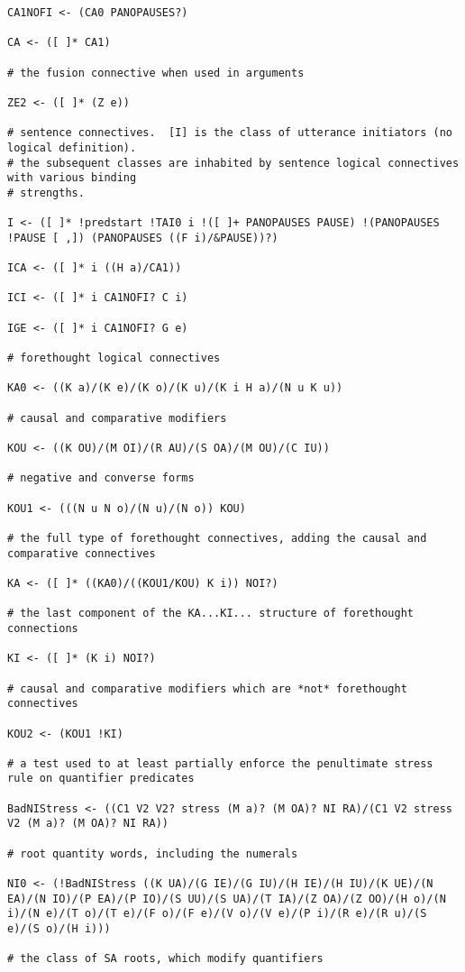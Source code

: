 \documentclass[12pt]{book}
\begin{document}
{\begin{verbatim}
CA1NOFI <- (CA0 PANOPAUSES?)

CA <- ([ ]* CA1)

# the fusion connective when used in arguments

ZE2 <- ([ ]* (Z e))

# sentence connectives.  [I] is the class of utterance initiators (no logical definition).
# the subsequent classes are inhabited by sentence logical connectives with various binding
# strengths.

I <- ([ ]* !predstart !TAI0 i !([ ]+ PANOPAUSES PAUSE) !(PANOPAUSES !PAUSE [ ,]) (PANOPAUSES ((F i)/&PAUSE))?)

ICA <- ([ ]* i ((H a)/CA1))

ICI <- ([ ]* i CA1NOFI? C i)

IGE <- ([ ]* i CA1NOFI? G e)

# forethought logical connectives

KA0 <- ((K a)/(K e)/(K o)/(K u)/(K i H a)/(N u K u))

# causal and comparative modifiers

KOU <- ((K OU)/(M OI)/(R AU)/(S OA)/(M OU)/(C IU))

# negative and converse forms

KOU1 <- (((N u N o)/(N u)/(N o)) KOU)

# the full type of forethought connectives, adding the causal and comparative connectives

KA <- ([ ]* ((KA0)/((KOU1/KOU) K i)) NOI?)

# the last component of the KA...KI... structure of forethought connections

KI <- ([ ]* (K i) NOI?)

# causal and comparative modifiers which are *not* forethought connectives

KOU2 <- (KOU1 !KI)

# a test used to at least partially enforce the penultimate stress rule on quantifier predicates

BadNIStress <- ((C1 V2 V2? stress (M a)? (M OA)? NI RA)/(C1 V2 stress V2 (M a)? (M OA)? NI RA))

# root quantity words, including the numerals

NI0 <- (!BadNIStress ((K UA)/(G IE)/(G IU)/(H IE)/(H IU)/(K UE)/(N EA)/(N IO)/(P EA)/(P IO)/(S UU)/(S UA)/(T IA)/(Z OA)/(Z OO)/(H o)/(N i)/(N e)/(T o)/(T e)/(F o)/(F e)/(V o)/(V e)/(P i)/(R e)/(R u)/(S e)/(S o)/(H i)))

# the class of SA roots, which modify quantifiers


\end{verbatim}}
\end{document}
